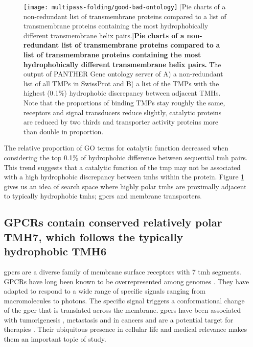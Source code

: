 \begin{figure}[!ht]
\centering
\texttt{[image: multipass-folding/good-bad-ontology]}
		[Pie charts of a non-redundant list of transmembrane proteins compared to a list of transmembrane proteins containing the most hydrophobically different transmembrane helix pairs.]{\textbf{Pie charts of a non-redundant list of transmembrane proteins compared to a list of transmembrane proteins containing the most hydrophobically different transmembrane helix pairs.}
    The output of PANTHER Gene ontology server of A) a non-redundant list of all TMPs in SwissProt and
    B) a list of the TMPs with the highest (0.1\%) hydrophobic discrepancy between adjacent TMHs.
    Note that the proportions of binding TMPs stay roughly the same, receptors and signal transducers reduce slightly, catalytic proteins are reduced by two thirds and transporter activity proteins more than double in proportion.
    }

\label{fig:good-bad-ontology}
\end{figure}

The relative proportion of GO terms for catalytic function decreased when considering the top 0.1\% of hydrophobic difference between sequential \gls{tmh} pairs.
This trend suggests that a catalytic function of the \gls{tmp} may not be associated with a high hydrophobic discrepancy between \gls{tmh}s within the protein.
Figure \ref{fig:good-bad-ontology} gives us an idea of search space where highly polar \gls{tmh}s are proximally adjacent to typically hydrophobic \gls{tmh}s; \gls{gpcr}s and membrane transporters.

\subsection{GPCRs contain conserved relatively polar TMH7, which follows the typically hydrophobic TMH6}

\gls{gpcr}s are a diverse family of membrane surface receptors with 7 \gls{tmh} segments.
GPCRs have long been known to be overrepresented among genomes \cite{Remm2000}.
They have adapted to respond to a wide range of specific signals ranging from macromolecules to photons.
The specific signal triggers a conformational change of the \gls{gpcr} that is translated across the membrane.
\gls{gpcr}s have been associated with tumorigenesis \cite{OHayre2013}, metastasis \cite{Singh2015} and in cancers \cite{Bar-Shavit2016} and are a potential target for therapies \cite{Arakaki2018}.
Their ubiquitous presence in cellular life and medical relevance makes them an important topic of study.

